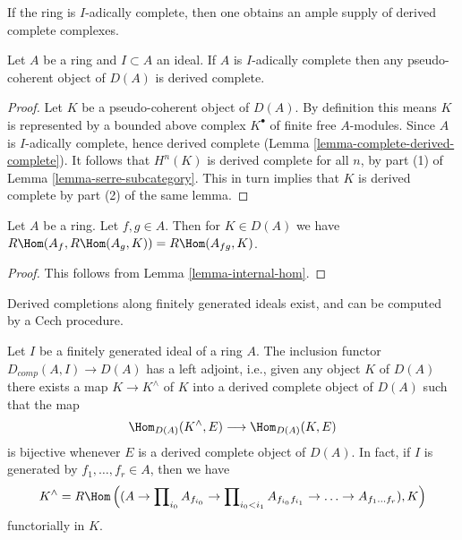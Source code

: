 \noindent
If the ring is $I$-adically complete, then one obtains an ample supply
of derived complete complexes.

\begin{lemma}
\label{lemma-pseudo-coherent-is-derived-complete}
Let $A$ be a ring and $I \subset A$ an ideal. If $A$ is $I$-adically complete
then any pseudo-coherent object of $D(A)$ is derived complete.
\end{lemma}

\begin{proof}
Let $K$ be a pseudo-coherent object of $D(A)$. By definition this
means $K$ is represented by a bounded above complex $K^\bullet$
of finite free $A$-modules. Since $A$ is $I$-adically complete, hence
derived complete (Lemma \ref{lemma-complete-derived-complete}).
It follows that $H^n(K)$ is derived complete for all $n$, by part (1)
of Lemma \ref{lemma-serre-subcategory}. This in turn implies that
$K$ is derived complete by part (2) of the same lemma.
\end{proof}

\begin{lemma}
\label{lemma-double-localize}
Let $A$ be a ring. Let $f, g \in A$. Then for $K \in D(A)$ we have
$R\Hom(A_f, R\Hom(A_g, K)) = R\Hom(A_{fg}, K)$.
\end{lemma}

\begin{proof}
This follows from Lemma \ref{lemma-internal-hom}.
\end{proof}

\begin{lemma}
\label{lemma-derived-completion}
\begin{slogan}
Derived completions along finitely generated ideals exist, and can
be computed by a Cech procedure.
\end{slogan}
Let $I$ be a finitely generated ideal of a ring $A$.
The inclusion functor $D_{comp}(A, I) \to D(A)$ has a
left adjoint, i.e., given any object $K$ of $D(A)$ there
exists a map $K \to K^\wedge$ of $K$ into a derived complete
object of $D(A)$ such that the map
$$
\Hom_{D(A)}(K^\wedge, E) \longrightarrow \Hom_{D(A)}(K, E)
$$
is bijective whenever $E$ is a derived complete object of $D(A)$.
In fact, if $I$ is generated by $f_1, \ldots, f_r \in A$, then we have
$$
K^\wedge = R\Hom\left((A \to \prod\nolimits_{i_0} A_{f_{i_0}} \to
\prod\nolimits_{i_0 < i_1} A_{f_{i_0}f_{i_1}}
\to \ldots \to A_{f_1\ldots f_r}), K\right)
$$
functorially in $K$.
\end{lemma}

